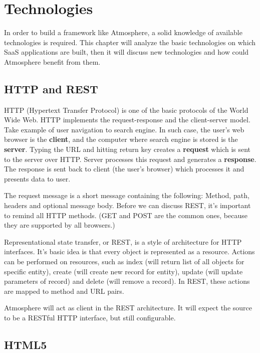 \section{Technologies}

In order to build a framework like Atmosphere, a solid knowledge of available technologies is required. This chapter will analyze the basic technologies on which SaaS applications are built, then it will discuss new technologies and how could Atmosphere benefit from them.

\subsection{HTTP and REST}

HTTP (Hypertext Transfer Protocol) is one of the basic protocols of the World Wide Web. HTTP implements the request-response and the client-server model. Take example of user navigation to search engine. In such case, the user's web browser is the \textbf{client}, and the computer where search engine is stored is the \textbf{server}. Typing the URL and hitting return key creates a \textbf{request} which is sent to the server over HTTP. Server processes this request and generates a \textbf{response}. The response is sent back to client (the user's browser) which processes it and presents data to user.

The request message is a short message containing the following: Method, path, headers and optional message body. Before we can discuss REST, it’s important to remind all HTTP methods. (GET and POST are the common ones, because they are supported by all browsers.)

Representational state transfer, or REST, is a style of architecture for HTTP interfaces. It's basic idea is that every object is represented as a resource. Actions can be performed on resources, such as index (will return list of all objects for specific entity), create (will create new record for entity), update (will update parameters of record) and delete (will remove a record). In REST, these actions are mapped to method and URL pairs. \citep{rails_way}

Atmosphere will act as client in the REST architecture. It will expect the source to be a RESTful HTTP interface, but still configurable. 

\subsection{HTML5}

